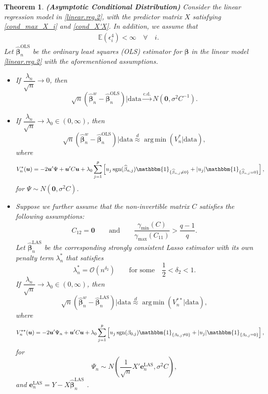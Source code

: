 \documentclass[12pt]{article}
\DeclareMathOperator*{\argmin}{arg\,min} %
\newcommand{\EX}{\mathbb{E}} %
\newcommand{\bnw}{\widehat{\bm{\beta}}_n^w} %
\newcommand{\bLAS}{\widehat{\bm{\beta}}_n^{\text{LAS}}} %
\newcommand{\bLS}{\widehat{\bm{\beta}}_n^{\text{OLS}}} %
\newcommand{\be}{\bm{\beta}} %
\newcommand{\dqn}{\frac{1}{\sqrt{n}}} %
\newcommand{\CONV}[1]{\stackrel{\text{#1}}{\longrightarrow}} %
\newcommand{\bu}{\bm{u}} %
\newtheorem{thm}{Theorem}[section]
\begin{document}
\begin{thm} \label{asympdistn}
	\textbf{(Asymptotic Conditional Distribution)} Consider the linear regression model in \eqref{linear.reg.2}, with the predictor matrix $X$ satisfying \eqref{cond_max_X_i} and \eqref{cond_X'X}. In addition, we assume that 
	\begin{align} \label{cond_epsilon4}
	\EX \left( \epsilon_i^4 \right) < \infty 
	\quad \forall \quad i.
	\end{align}
	Let $\bLS$ be the ordinary least squares (OLS) estimator for $\be$ in the linear model \eqref{linear.reg.2} with the aforementioned assumptions.
	\begin{itemize}
		\item [ (a) ] If $\dfrac{\lambda_n}{\sqrt{n}} \to 0$, then
				$$
				\sqrt{n} \left( 
				\bnw - \bLS 
				\right) 
				\bigg| \text{data} 
				\CONV{c.d.} 
				N \left( \bm{0}, \sigma^2 C^{-1} \right).
				$$	 
		\item [ (b) ] 	If $\dfrac{\lambda_n}{\sqrt{n}} \to \lambda_0 \in (0,\infty)$, then
				$$
				\sqrt{n} \left( 
				\bnw - \bLS 
				\right) 
				\bigg| \text{data} 
				\stackrel{d}{\approx} 
				\argmin \left(
							V_n^* \big| \text{data}
						\right),
				$$
			where     
				$$
				V_n^*(\bu) = -2 \bu' \Psi + \bu' C \bu 
				+ \lambda_0 \sum_{j=1}^p 
				\left[
					u_j \, \text{sgn}(\widehat{\beta}_{n,j}) 
						\mathbbm{1}_{ \{ \widehat{\beta}_{n,j} \neq 0 \}}
					+ | u_j | \mathbbm{1}_{ \{ \widehat{\beta}_{n,j} = 0 \}} 
				\right],
				$$
			for $\Psi \sim N \left( \bm{0} , \sigma^2 C \right)$.
		\item [ (c) ] Suppose we further assume that the non-invertible matrix $C$ satisfies the following assumptions:
			$$
				C_{12} = \bm{0}
				\qquad \text{and} \qquad 
				\dfrac{ \gamma_{\text{min}} ( C ) }
					  { \gamma_{\text{max}} ( C_{11} ) } 
				> \dfrac{ q-1 }{ q }. 
			$$
			Let $\bLAS$ be the corresponding strongly consistent Lasso estimator with its own penalty term $\lambda_n^*$ that satisfies
			$$
				\lambda_n^* 
				= \mathcal{O} ( n ^ {\delta_2} )
				\qquad \text{for some} \quad
				\frac{1}{2} < \delta_2 < 1.	
			$$  
			If $\dfrac{\lambda_n}{\sqrt{n}} \to \lambda_0 \in (0,\infty)$, then
				$$
				\sqrt{n} \left( 
				\bnw - \bLAS 
				\right) 
				\bigg| \text{data} 
				\stackrel{d}{\approx} 
				\argmin \left(
							V_n^{**} \big| \text{data}
						\right),
				$$
			where   
				$$
				V_n^{**}(\bu) = -2 \bu' \Psi_n + \bu' C \bu 
				+ \lambda_0 \sum_{j=1}^p 
				\left[
				u_j \, \text{sgn}(\beta_{0,j}) \mathbbm{1}_{ \{ \beta_{0,j} \neq 0 \}}
				+ | u_j | \mathbbm{1}_{ \{ \beta_{0,j} = 0 \}} 
				\right],
				$$
			for 
			$$
			\Psi_n \sim N \left( \dqn X' \bm{e}_n^{\text{LAS}} , \sigma^2 C \right),
			$$
			and $\bm{e}_n^{\text{LAS}} = Y - X \bLAS$ .   
	\end{itemize}  
\end{thm} 
\end{document}
